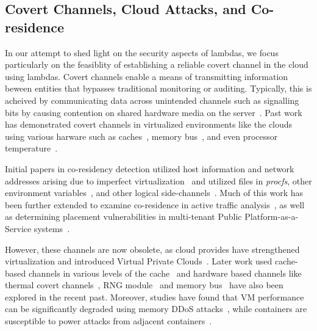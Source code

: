 

\subsection{Covert Channels, Cloud Attacks, and Co-residence}
\label{sec:background:covertchannels}
In our attempt to shed light on the security aspects of lambdas, we focus
particularly on the feasiblity of establishing a reliable covert channel in the
cloud using lambdas.  Covert channels enable a means of transmitting information
beween entities that bypasses traditional monitoring or auditing. Typically,
this is acheived by communicating data across unintended channels such as
signalling bits by causing contention on shared hardware media on the
server~\cite{L2cacheCovertChannels,
ProcessorCovertChannels,ThermalCovertChannel,SshOverCovertChannel,wuusenix2012}.
Past work has demonstrated covert channels in virtualized environments like the
clouds using various harware such as
caches~\cite{ristenpartccs2009,L2cacheCovertChannels}, memory
bus~\cite{wuusenix2012}, and even processor
temperature~\cite{ThermalCovertChannel}. 

Initial papers in co-residency detection utilized host information and network
addresses arising due to imperfect virtualization~\cite{ristenpartccs2009} and
utilized files in \textit{procfs}, other environment
variables~\cite{wangusenix2018,wuusenix2012}, and other logical
side-channels~\cite{varad191016,vmplacement}.  Much of this work has been
further extended to examine co-residence in active traffic
analysis~\cite{bates2012}, as well as determining placement vulnerabilities in
multi-tenant Public Platform-as-a-Service systems~\cite{varad191016,
zhangpaas2016}. 

However, these channels are now obsolete, as cloud provides have strengthened
virtualization and introduced Virtual Private Clouds~\cite{awsvpc}. Later work
used cache-based channels in various levels of the cache~\cite{xuccsw2011,
zhangccs2014, liu2015, kaylaap2016} and hardware based channels like thermal
covert channels~\cite{mastiusenix2015}, RNG module~\cite{evtyushkinccs2016} and
memory bus~\cite{wuusenix2012} have also been explored in the recent past.
Moreover, studies have found that VM performance can be significantly degraded
using memory DDoS attacks~\cite{zhang2016memory}, while containers are
susceptible to power attacks from adjacent containers~\cite{gao2017}.  


